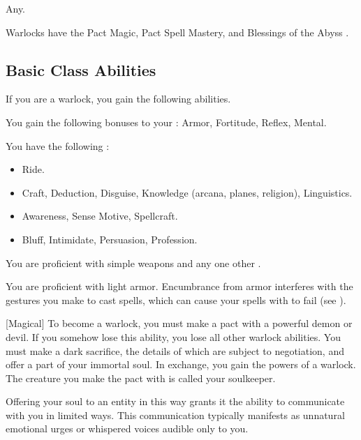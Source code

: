      Any.

     Warlocks have the Pact Magic, Pact Spell Mastery, and Blessings of the Abyss .

    \subsection{Basic Class Abilities}
        If you are a warlock, you gain the following abilities.

        You gain the following bonuses to your :  Armor,  Fortitude,  Reflex,  Mental.

        You have the following :
        \begin{itemize}
            \item {} Ride.
            \item {} Craft, Deduction, Disguise, Knowledge (arcana, planes, religion), Linguistics.
            \item {} Awareness, Sense Motive, Spellcraft.
            \item {} Bluff, Intimidate, Persuasion, Profession.
        \end{itemize}

        You are proficient with simple weapons and any one other .

        You are proficient with light armor.
        Encumbrance from armor interferes with the gestures you make to cast spells, which can cause your spells with  to fail (see ).

        [Magical]
        To become a warlock, you must make a pact with a powerful demon or devil.
        If you somehow lose this ability, you lose all other warlock abilities.
        You must make a dark sacrifice, the details of which are subject to negotiation, and offer a part of your immortal soul.
        In exchange, you gain the powers of a warlock.
        The creature you make the pact with is called your soulkeeper.

        Offering your soul to an entity in this way grants it the ability to communicate with you in limited ways.
        This communication typically manifests as unnatural emotional urges or whispered voices audible only to you.

